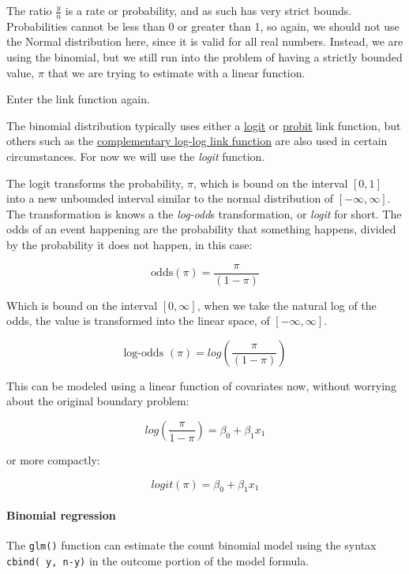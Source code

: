 \documentclass[
]{article}
\begin{document}
The ratio \(\frac{y}{n}\) is a rate or probability, and as such has very strict bounds. Probabilities cannot be less than 0 or greater than 1, so again, we should not use the Normal distribution here, since it is valid for all real numbers. Instead, we are using the binomial, but we still run into the problem of having a strictly bounded value, \(\pi\) that we are trying to estimate with a linear function.

Enter the link function again.

The binomial distribution typically uses either a \href{https://en.wikipedia.org/wiki/Logit}{logit} or \href{https://en.wikipedia.org/wiki/Probit}{probit} link function, but others such as the \href{http://data.princeton.edu/wws509/notes/c3s7.html}{complementary log-log link function} are also used in certain circumstances. For now we will use the \emph{logit} function.

The logit transforms the probability, \(\pi\), which is bound on the interval \([0,1]\) into a new unbounded interval similar to the normal distribution of \([-\infty, \infty]\). The transformation is knows a the \emph{log-odd}s transformation, or \emph{logit} for short. The odds of an event happening are the probability that something happens, divided by the probability it does not happen, in this case:

\[\text{odds}({\pi}) = \frac{\pi}{(1-\pi)}\]

Which is bound on the interval \([0, \infty]\), when we take the natural log of the odds, the value is transformed into the linear space, of \([-\infty, \infty]\).

\[\text{log-odds }({\pi}) = log  \left ( \frac{\pi}{(1-\pi)}  \right) \]

This can be modeled using a linear function of covariates now, without worrying about the original boundary problem:

\[log  \left ( \frac{\pi}{1-\pi}  \right) = \beta_0 +\beta_1 x_1\]

or more compactly:

\[logit (\pi)  = \beta_0 +\beta_1 x_1\]

\hypertarget{binomial-regression}{%
\paragraph{Binomial regression}\label{binomial-regression}}

The \texttt{glm()} function can estimate the count binomial model using the syntax \texttt{cbind(\ y,\ n-y)} in the outcome portion of the model formula.
\end{document}
